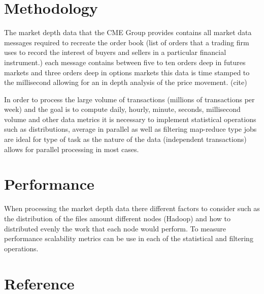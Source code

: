 \documentclass[12pt]{article} %
\begin{document}

\section{Methodology}

The market depth data that the CME Group provides contains all market data messages required to recreate the order book (list of orders that a trading firm uses to record the interest of buyers and sellers in a particular financial instrument.) each message contains between five to ten orders deep in futures markets and three orders deep in options markets this data is time stamped to the millisecond allowing for an in depth analysis of the price movement. (cite)

In order to process the large volume of transactions (millions of transactions per week) and the goal is to compute daily, hourly, minute, seconds, millisecond volume and other data metrics it is necessary to implement statistical operations such as distributions, average in parallel as well as filtering map-reduce type jobs are ideal for type of task as the nature of the data (independent transactions) allows for parallel processing in most cases.


\section{Performance}

When processing the market depth data there different factors to consider such as the distribution of the files amount different nodes (Hadoop) and how to distributed evenly the work that each node would perform. To measure performance  scalability metrics can be use in each of the statistical and filtering operations.

\newpage

\section{Reference}
\end{document}
